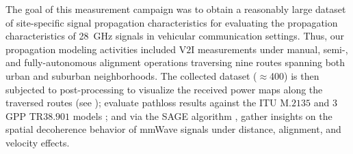 \documentclass[10pt, twocolumn]{IEEEtran}
\begin{document}
The goal of this measurement campaign was to obtain a reasonably large dataset of site-specific signal propagation characteristics for evaluating the propagation characteristics of \SI{28}{\giga\hertz} signals in vehicular communication settings. Thus, our propagation modeling activities included V$2$I measurements under manual, semi-, and fully-autonomous alignment operations traversing nine routes spanning both urban and suburban neighborhoods. The collected dataset ($\approx$\SI{400}{}) is then subjected to post-processing to visualize the received power maps along the traversed routes (see \cite{NRSM}); evaluate pathloss results against the ITU M$.2135$ and $3$GPP TR$38.901$ models \cite{MacCartneyModelsOverview, Qualcomm3GPP}; and via the SAGE algorithm \cite{SAGE1}, gather insights on the spatial decoherence behavior of mmWave signals under distance, alignment, and velocity effects.
\end{document}
